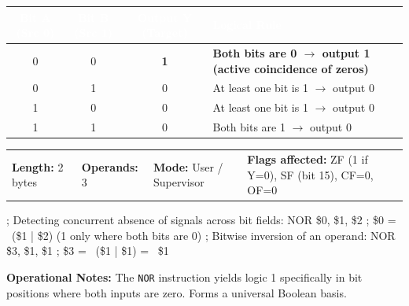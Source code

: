 \documentclass[11pt,a4paper]{article}
\newcommand{\reg}{\$}
\renewcommand{\arraystretch}{1.25}
\begin{document}
\vspace{0.5mm}
\par\vspace{0.8mm}
\noindent
{\footnotesize\renewcommand{\arraystretch}{1.1}%
\begin{tabularx}{\textwidth}{@{} c c c X @{}}
\toprule
\rowcolor{limslate}
\textcolor{white}{\textbf{Bit A (Src 0)}} & \textcolor{white}{\textbf{Bit B (Src 1)}} & \textcolor{white}{\textbf{Output Y (Target)}} & \textcolor{white}{\textbf{Logical Rule}} \\
\midrule
\rowcolor{limorangelight}
0 & 0 & \textbf{1} & \textbf{Both bits are 0 $\rightarrow$ output 1 (active coincidence of zeros)} \\
\rowcolor{limroweven}
0 & 1 & 0 & At least one bit is 1 $\rightarrow$ output 0 \\
1 & 0 & 0 & At least one bit is 1 $\rightarrow$ output 0 \\
1 & 1 & 0 & Both bits are 1 $\rightarrow$ output 0 \\
\bottomrule
\end{tabularx}%
}
\vspace{1mm}

\begin{tcolorbox}[
    enhanced,
    colback=limcard,
    colframe=limborder,
    boxrule=0.6pt,
    arc=3pt,
    left=8pt,right=8pt,top=4pt,bottom=4pt
]
    \footnotesize
    \noindent
    \begin{tabularx}{\textwidth}{@{}l l l X@{}}
        \textbf{Length:} 2 bytes &
        \textbf{Operands:} 3 &
        \textbf{Mode:} User / Supervisor &
        \textbf{Flags affected:} ZF (1 if Y=0), SF (bit 15), CF=0, OF=0
    \end{tabularx}
\end{tcolorbox}

\begin{examplebox}[title={Usage Example (LIM2 Assembly)},top=4pt,bottom=4pt]
\begin{limasm}
; Detecting concurrent absence of signals across bit fields:
NOR \reg0, \reg1, \reg2     ; \reg0 = ~(\reg1 | \reg2) (1 only where both bits are 0)
; Bitwise inversion of an operand:
NOR \reg3, \reg1, \reg1     ; \reg3 = ~(\reg1 | \reg1) = ~\reg1
\end{limasm}
\vspace{1mm}
\footnotesize\color{limmuted}
\textbf{Operational Notes:} The \texttt{NOR} instruction yields logic 1 specifically in bit positions where both inputs are zero. Forms a universal Boolean basis.
\end{examplebox}
\end{document}

